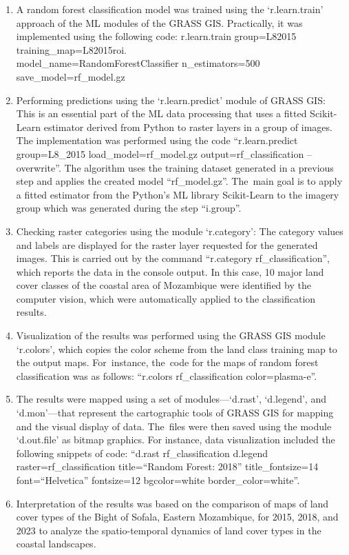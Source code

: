 \documentclass[coasts,article,accept,pdftex,oneauthor]{Definitions/mdpi}
\begin{document}
\begin{enumerate}
  \item A random forest classification model was trained using {the }`r.learn.train' approach of {the }ML modules of {the }GRASS GIS. {Practically, it was implemented using the following code: r.learn.train group=L82015 training\_map=L82015roi. \\
  model\_name=RandomForestClassifier n\_estimators=500 save\_model=rf\_model.gz}
  \item Performing predictions using the `r.learn.predict' module of GRASS GIS{: This is an essential part of the ML data processing }that uses a fitted Scikit-Learn estimator {derived} from Python to raster layers in a group of images. {The implementation was performed using the code ``r.learn.predict group=L8\_2015 load\_model=rf\_model.gz output=rf\_classification --overwrite''. {The} algorithm uses{ }the training {dataset} generated in {a }previous step and {applies} the created model ``rf\_model.gz''. {The}~main goal{ }is to apply a fitted estimator from the Python's ML library Scikit-Learn to {the imagery group }which was generated during the step ``i.group''.} 
  \item {Checking} raster categories using {the }module `r.category'{: }{The category values and labels {are displayed }for{ }the raster layer requested for the generated images{. This is carried out }by the command ``r.category rf\_classification'', {which} reports the data in the console output. In} this case, 10 major land cover classes of the coastal area of Mozambique were identified by the computer vision, which were automatically applied to the classification results.
  \item Visualization of the results {was performed }using {the GRASS GIS }module `r.colors', which copies {the }color scheme from {the }land class training map to the output maps{. For~instance, the~code for the maps of random forest classification {was} as follows: ``r.colors rf\_classification color=plasma-e''.}
  \item The results {were mapped }using a set of modules---`d.rast', `d.legend', and `d.mon'---{that represent the cartographic tools of GRASS GIS {for mapping and the visual display of data}}. %
  The~files were {then }saved using the module `d.out.file' as bitmap graphics. {For instance, data visualization included the following snippets of code: ``d.rast rf\_classification d.legend raster=rf\_classification title=``Random Forest: 2018'' title\_fontsize=14 font=``Helvetica'' fontsize=12 bgcolor=white border\_color=white''.}
  \item {Interpretation} of the results {was based on the} comparison of maps of land cover types of the Bight of Sofala, Eastern Mozambique, for 2015, 2018, and 2023 {to analyze the spatio-temporal dynamics of land cover types in the coastal landscapes}. 
\end{enumerate}  
\end{document}
